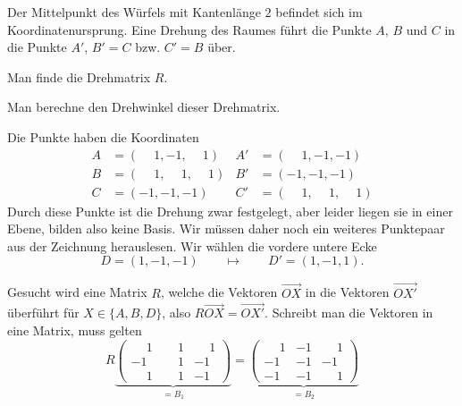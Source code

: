 Der Mittelpunkt des Würfels mit Kantenlänge $2$ befindet sich im
Koordinatenursprung.
Eine Drehung des Raumes führt die Punkte $A$, $B$ und $C$ in
die Punkte $A'$, $B'=C$ bzw. $C'=B$ über.

\begin{center}
\end{center}

\begin{teilaufgaben}
\item
Man finde die Drehmatrix $R$.
\item
Man berechne den Drehwinkel dieser Drehmatrix.
\end{teilaufgaben}

\begin{loesung}
Die Punkte haben die Koordinaten
\begin{align*}
A&=(\phantom{-}1,         - 1,\phantom{-}1)
			&A'&=(\phantom{-}1,         - 1,         - 1)\\
B&=(\phantom{-}1,\phantom{-}1,\phantom{-}1)
			&B'&=(         - 1,         - 1,         - 1)\\
C&=(         - 1,         - 1,         - 1)
			&C'&=(\phantom{-}1,\phantom{-}1,\phantom{-}1)
\end{align*}
Durch diese Punkte ist die Drehung zwar festgelegt, aber leider liegen
sie in einer Ebene, bilden also keine Basis.
Wir müssen daher noch ein weiteres Punktepaar aus der Zeichnung
herauslesen.
Wir wählen die vordere untere Ecke
\[
D=(1,-1,-1) \qquad\mapsto\qquad D'=(1,-1,1).
\]
\begin{teilaufgaben}
\item
Gesucht wird eine Matrix $R$, welche die Vektoren $\overrightarrow{OX}$
in die Vektoren $\overrightarrow{OX'}$ überführt für $X\in\{A,B,D\}$,
also $R\overrightarrow{OX}=\overrightarrow{OX'}$.
Schreibt man die Vektoren in eine Matrix, muss gelten
\[
R
\underbrace{
\begin{pmatrix}
\phantom{-}1&\phantom{-}1&\phantom{-}1\\
         - 1&\phantom{-}1&         - 1\\
\phantom{-}1&\phantom{-}1&         - 1
\end{pmatrix}}_{\displaystyle =B_1}
=
\underbrace{
\begin{pmatrix}
\phantom{-}1&-1&\phantom{-}1\\
         - 1&-1&         - 1\\
         - 1&-1&\phantom{-}1
\end{pmatrix}}_{\displaystyle =B_2}
\]
\end{teilaufgaben}
\end{loesung}
